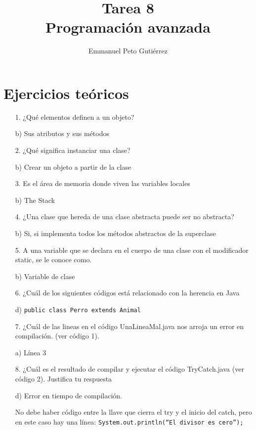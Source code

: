 \documentclass{article}
\title{Tarea 8\\Programación avanzada}
\author{Emmanuel Peto Gutiérrez}
\begin{document}
\maketitle

\section{Ejercicios teóricos}

\begin{itemize}
\item[1.] ¿Qué elementos definen a un objeto?

b) Sus atributos y sus métodos

\item[2.] ¿Qué significa instanciar una clase?

b) Crear un objeto a partir de la clase

\item[3.] Es el área de memoria donde viven las variables locales

b) The Stack

\item[4.] ¿Una clase que hereda de una clase abstracta puede ser no abstracta?

b) Si, si implementa todos los métodos abstractos de la superclase

\item[5.] A una variable que se declara en el cuerpo de una clase con el modificador static, se le
conoce como.

b) Variable de clase

\item[6.] ¿Cuál de los siguientes códigos está relacionado con la herencia en Java

d) \texttt{public class Perro extends Animal}

\item[7.] ¿Cuál de las lineas en el código UnaLineaMal.java nos arroja un error en compilación. (ver
código 1).

a) Línea 3

\item[8.] ¿Cuál es el resultado de compilar y ejecutar el código TryCatch.java (ver código 2). Justifica
tu respuesta

d) Error en tiempo de compilación.

No debe haber código entre la llave que cierra el try y el inicio del catch, pero en este caso hay una línea: \texttt{System.out.println(``El divisor es cero'');}


\end{itemize}
\end{document}
